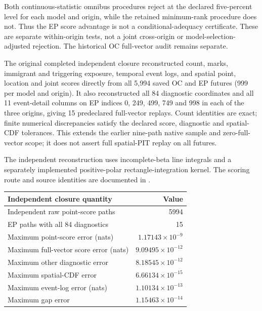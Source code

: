 Both continuous-statistic omnibus procedures reject at the declared five-percent level for each model and origin, while the retained minimum-rank procedure does not. Thus the EP score advantage is not a conditional-adequacy certificate. These are separate within-origin tests, not a joint cross-origin or model-selection-adjusted rejection. The historical OC full-vector audit remains separate.

The original completed independent closure reconstructed count, marks, immigrant and triggering exposure, temporal event logs, and spatial point, location and joint scores directly from all 5,994 saved OC and EP futures (999 per model and origin). It also reconstructed all 84 diagnostic coordinates and all 11 event-detail columns on EP indices 0, 249, 499, 749 and 998 in each of the three origins, giving 15 predeclared full-vector replays. Count identities are exact; finite numerical discrepancies satisfy the declared score, diagnostic and spatial-CDF tolerances. This extends the earlier nine-path native sample and zero-full-vector scope; it does not assert full spatial-PIT replay on all futures.

The independent reconstruction uses incomplete-beta line integrals and a separately implemented positive-polar rectangle-integration kernel. The scoring route and source identities are documented in .

\begin{center}\begin{tabular}{lr}\toprule Independent closure quantity & Value\\\midrule
Independent raw point-score paths & 5994 \\
EP paths with all 84 diagnostics & 15 \\
Maximum point-score error (nats) & $1.17143\times 10^{-9}$ \\
Maximum full-vector score error (nats) & $9.09495\times 10^{-12}$ \\
Maximum other diagnostic error & $8.18545\times 10^{-12}$ \\
Maximum spatial-CDF error & $6.66134\times 10^{-15}$ \\
Maximum event-log error (nats) & $1.10134\times 10^{-13}$ \\
Maximum gap error & $1.15463\times 10^{-14}$ \\
\bottomrule\end{tabular}\end{center}


